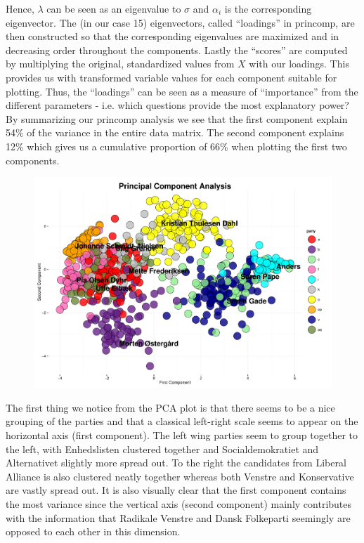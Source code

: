 Hence, $\lambda$ can be seen as an eigenvalue to $\sigma$ and $\alpha_i$ is the corresponding eigenvector. The (in our case 15) eigenvectors, called “loadings” in princomp, are then constructed so that the corresponding eigenvalues are maximized and in decreasing order throughout the components. Lastly the “scores” are computed by multiplying the original, standardized values from $X$ with our loadings. This provides us with transformed variable values for each component suitable for plotting. Thus, the “loadings” can be seen as a measure of “importance” from the different parameters - i.e. which questions provide the most explanatory power?
By summarizing our princomp analysis we see that the first component explain 54\% of the variance in the entire data matrix. The second component explains 12\% which gives us a cumulative proportion of 66\% when plotting the first two components.
\begin{figure}[H]
\includegraphics[width=\textwidth]{PCA1}
\end{figure}
The first thing we notice from the PCA plot is that there seems to be a nice grouping of the parties and that a classical left-right scale seems to appear on the horizontal axis (first component). The left wing parties seem to group together to the left, with Enhedslisten clustered together and Socialdemokratiet and Alternativet slightly more spread out. To the right the candidates from Liberal Alliance is also clustered neatly together whereas both Venstre and Konservative are vastly spread out. It is also visually clear that the first component contains the most variance since the vertical axis (second component) mainly contributes with the information that Radikale Venstre and Dansk Folkeparti seemingly are opposed to each other in this dimension. 
